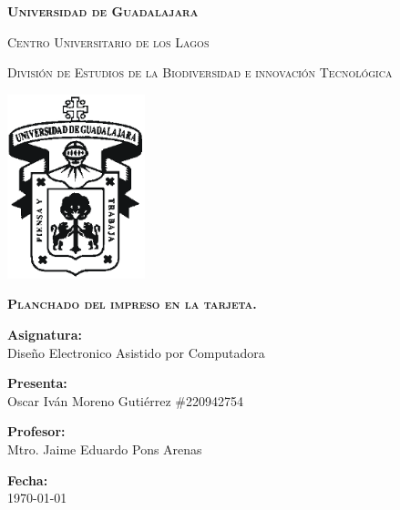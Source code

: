 \documentclass[12pt]{report}
\begin{document}
\setlength{\hoffset}{27 pt} %
\begin{titlepage}
{\centering
{\scshape\bfseries\fontsize{29.16}{34.992}\selectfont Universidad de Guadalajara \par}
\vspace{0.5cm}
{\scshape\Large Centro Universitario de los Lagos \par}
\vspace{1cm}
{\scshape\Large División de Estudios de la Biodiversidad e innovación Tecnológica \par}
\vspace{1cm}
{\graphicspath{{imagenes/Portada}} %
\includegraphics[width=0.3\textwidth]{image.png}\par}
\vspace{1cm}
{\scshape\large\bfseries Planchado del impreso en la tarjeta. \par}
\vspace{1.5cm}
{\large \textbf{Asignatura:} \\Diseño Electronico Asistido por Computadora\par}
\vfill
{\large \textbf{Presenta:} \\Oscar Iván Moreno Gutiérrez \#220942754\par}
\vfill
{\large \textbf{Profesor:} \\Mtro. Jaime Eduardo Pons Arenas \par}
\vfill
\vfill
\begin{flushright}
  {\normalsize \textbf {Fecha:} \\ \today}
\end{flushright}
\vfill}
{\large  \par}
\end{titlepage}

\tableofcontents
\newpage
\end{document}
